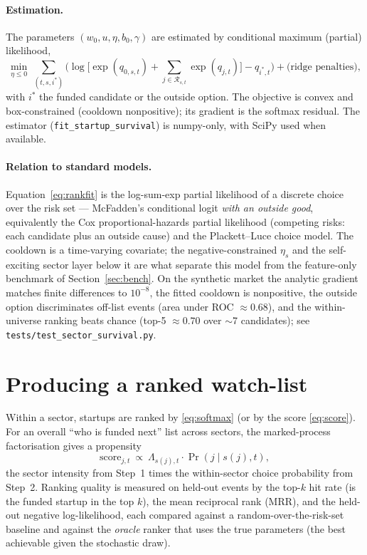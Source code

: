 \documentclass[11pt]{article}
\newcommand{\code}[1]{\texttt{#1}}
\newcommand{\Rset}{\mathcal{R}}
\begin{document}
\paragraph{Estimation.} The parameters $(w_0,u,\eta,b_0,\gamma)$ are estimated by
conditional maximum (partial) likelihood,
\begin{equation}
\min_{\eta\le0}\ \sum_{(t,s,i^\ast)}\Big(\log\big[\exp(q_{0,s,t})+\!\!\sum_{j\in\Rset_{s,t}}\!\!\exp(q_{j,t})\big]-q_{i^\ast,t}\Big)+\text{(ridge penalties)},
\label{eq:rankfit}
\end{equation}
with $i^\ast$ the funded candidate or the outside option. The objective is convex and
box-constrained (cooldown nonpositive); its gradient is the softmax residual. The
estimator (\code{fit\_startup\_survival}) is numpy-only, with SciPy used when available.

\paragraph{Relation to standard models.} Equation~\eqref{eq:rankfit} is the log-sum-exp
partial likelihood of a discrete choice over the risk set --- McFadden's conditional logit
\emph{with an outside good}, equivalently the Cox proportional-hazards partial likelihood
(competing risks: each candidate plus an outside cause) and the Plackett--Luce choice
model. The cooldown is a time-varying covariate; the negative-constrained $\eta_s$ and the
self-exciting sector layer below it are what separate this model from the feature-only
benchmark of Section~\ref{sec:bench}. On the synthetic market the analytic gradient
matches finite differences to $10^{-8}$, the fitted cooldown is nonpositive, the outside
option discriminates off-list events (area under ROC $\approx0.68$), and the
within-universe ranking beats chance (top-5 $\approx0.70$ over $\sim$7 candidates); see
\code{tests/test\_sector\_survival.py}.

\section{Producing a ranked watch-list}

Within a sector, startups are ranked by \eqref{eq:softmax} (or by the score
\eqref{eq:score}). For an overall ``who is funded next'' list across sectors, the
marked-process factorisation gives a propensity
\begin{equation}
\text{score}_{j,t}\ \propto\ \Lambda_{s(j),t}\cdot\Pr(j\mid s(j),t),
\label{eq:marked}
\end{equation}
the sector intensity from Step~1 times the within-sector choice probability from Step~2.
Ranking quality is measured on held-out events by the top-$k$ hit rate (is the funded
startup in the top $k$), the mean reciprocal rank (MRR), and the held-out negative
log-likelihood, each compared against a random-over-the-risk-set baseline and against the
\emph{oracle} ranker that uses the true parameters (the best achievable given the
stochastic draw).
\end{document}
